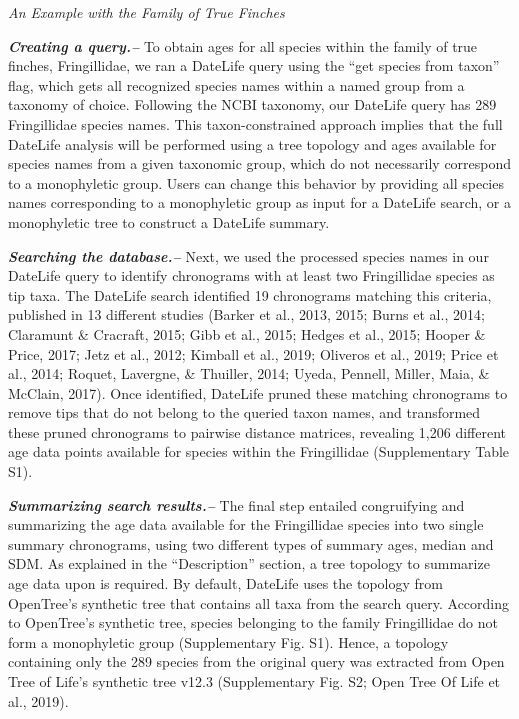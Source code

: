 \documentclass[english,man]{apa6}
\begin{document}
\newpage

\begin{center}
\emph{An Example with the Family of True Finches}
\end{center}

\textbf{\emph{Creating a query.--}}
To obtain ages for all species within the family of true finches, Fringillidae, we ran a DateLife query using the \enquote{get species from taxon} flag,
which gets all recognized species names within a named group from a taxonomy of choice.
Following the NCBI taxonomy, our DateLife query has 289 Fringillidae species names.
This taxon-constrained approach implies that the full DateLife analysis will be performed using a tree topology and ages available for species names from a given taxonomic group, which do not necessarily correspond to a monophyletic group. Users can change this behavior by providing all species names corresponding to a monophyletic group as input for a DateLife search, or a monophyletic tree to construct a DateLife summary.

\textbf{\emph{Searching the database.--}}
Next, we used the processed species names in our DateLife query to identify chronograms with at least two Fringillidae species as tip taxa.
The DateLife search identified 19 chronograms matching this criteria, published in 13 different studies (Barker et al., 2013, 2015; Burns et al., 2014; Claramunt \& Cracraft, 2015; Gibb et al., 2015; Hedges et al., 2015; Hooper \& Price, 2017; Jetz et al., 2012; Kimball et al., 2019; Oliveros et al., 2019; Price et al., 2014; Roquet, Lavergne, \& Thuiller, 2014; Uyeda, Pennell, Miller, Maia, \& McClain, 2017).
Once identified, DateLife pruned these matching chronograms to remove tips that do not belong to the queried taxon names, and transformed these pruned chronograms to pairwise distance matrices, revealing 1,206 different age data points available for species within the Fringillidae (Supplementary Table S1).

\textbf{\emph{Summarizing search results.--}}
The final step entailed congruifying and summarizing the age data available for the Fringillidae species into two single summary chronograms, using two different types of summary ages, median and SDM.
As explained in the \enquote{Description} section, a tree topology to summarize age data upon is required.
By default, DateLife uses the topology from OpenTree's synthetic tree that contains all taxa from the search query.
According to OpenTree's synthetic tree, species belonging to the family Fringillidae do not form a monophyletic group (Supplementary Fig. S1). Hence, a topology containing only the 289 species from the original query was extracted from Open Tree of Life's synthetic tree v12.3 (Supplementary Fig. S2; Open Tree Of Life et al., 2019).
\end{document}
